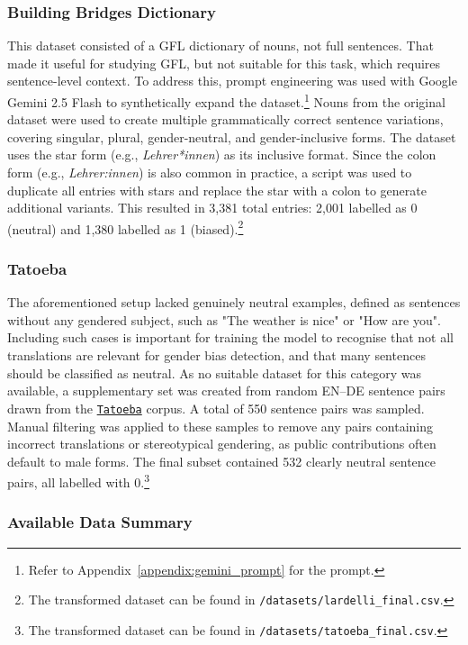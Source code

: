\subsubsection{Building Bridges Dictionary} 
This dataset consisted of a GFL dictionary of nouns, not full sentences. That made it useful for studying GFL, but not suitable for this task, which requires sentence-level context. To address this, prompt engineering was used with Google Gemini 2.5 Flash to synthetically expand the dataset.\footnote{Refer to Appendix~\ref{appendix:gemini_prompt} for the prompt.} Nouns from the original dataset were used to create multiple grammatically correct sentence variations, covering singular, plural, gender-neutral, and gender-inclusive forms. The dataset uses the star form (e.g., \textit{Lehrer*innen}) as its inclusive format. Since the colon form (e.g., \textit{Lehrer:innen}) is also common in practice, a script was used to duplicate all entries with stars and replace the star with a colon to generate additional variants. This resulted in 3,381 total entries: 2,001 labelled as 0 (neutral) and 1,380 labelled as 1 (biased).\footnote{The transformed dataset can be found in \texttt{/datasets/lardelli\_final.csv}.}

\subsubsection{Tatoeba} 

The aforementioned setup lacked genuinely neutral examples, defined as sentences without any gendered subject, such as "The weather is nice" or "How are you". Including such cases is important for training the model to recognise that not all translations are relevant for gender bias detection, and that many sentences should be classified as neutral. As no suitable dataset for this category was available, a supplementary set was created from random EN–DE sentence pairs drawn from the \texttt{\href{https://tatoeba.org/en/}{Tatoeba}} corpus. A total of 550 sentence pairs was sampled. Manual filtering was applied to these samples to remove any pairs containing incorrect translations or stereotypical gendering, as public contributions often default to male forms. The final subset contained 532 clearly neutral sentence pairs, all labelled with 0.\footnote{The transformed dataset can be found in \texttt{/datasets/tatoeba\_final.csv}.}


\subsubsection{Available Data Summary}

